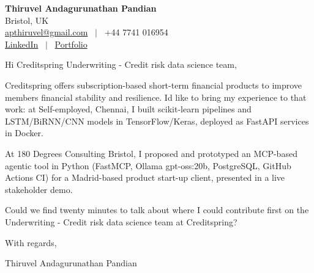 \documentclass[11pt,a4paper]{article}
\begin{document}
\raggedright
\pagestyle{empty}

\begin{center}
    {\LARGE \color{linkblue} \textbf{Thiruvel Andagurunathan Pandian}}\\[0.2cm]
    Bristol, UK \\
    \href{mailto:apthiruvel@gmail.com}{apthiruvel@gmail.com} \ $|$ \ +44 7741 016954 \\
\href{https://www.linkedin.com/in/thiruvel-a-p/}{LinkedIn} \ $|$ \ \href{https://thiruvel-ap.github.io/PersonalPortfolio/}{Portfolio}
\end{center}

\vspace{0.4cm}

\noindent
Hi Creditspring Underwriting - Credit risk data science team,

Creditspring offers subscription-based short-term financial products to improve members\textquotesingle{} financial stability and resilience. I\textquotesingle{}d like to bring my experience to that work: at Self-employed, Chennai, I built scikit-learn pipelines and LSTM/BiRNN/CNN models in TensorFlow/Keras, deployed as FastAPI services in Docker.

At 180 Degrees Consulting Bristol, I proposed and prototyped an MCP-based agentic tool in Python (FastMCP, Ollama gpt-oss:20b, PostgreSQL, GitHub Actions CI) for a Madrid-based product start-up client, presented in a live stakeholder demo.

Could we find twenty minutes to talk about where I could contribute first on the Underwriting - Credit risk data science team at Creditspring?

\vspace{0.5cm}

With regards,

Thiruvel Andagurunathan Pandian
\end{document}
